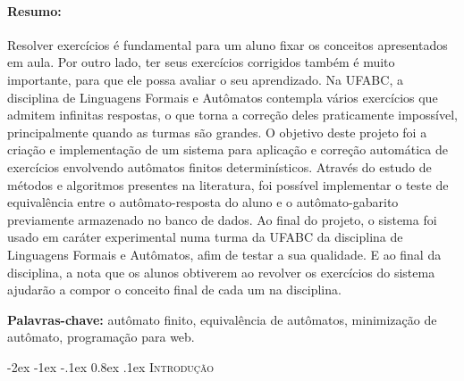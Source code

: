 \documentclass[plainsections, a0,  25pt]{sciposter} %
\makeatletter
\newcommand{\largo}{\fontsize{36}{40}\selectfont } %
\renewcommand\section{\@startsection {section}{1}{\z@}%
                                   {-2ex \@plus -1ex \@minus -.1ex}%
                                   {0.8ex \@plus.1ex}%
                                   {\normalfont\largo\bfseries}}
\makeatother
\begin{document}
\vspace{1.2cm}
\begin{multicols}{3}
  
\paragraph{Resumo:}
Resolver exercícios é fundamental para um aluno fixar os conceitos apresentados em aula. Por outro lado, ter seus exercícios corrigidos também é muito importante, para que ele possa avaliar o seu aprendizado. Na UFABC, a disciplina de Linguagens Formais e Autômatos contempla vários exercícios que admitem infinitas respostas, o que torna a correção deles praticamente impossível, principalmente quando as turmas são grandes. O objetivo deste projeto foi a criação e implementação de um sistema para aplicação e correção automática de exercícios envolvendo autômatos finitos determinísticos. Através do estudo de métodos e algoritmos presentes na literatura, foi possível implementar o teste de equivalência entre o autômato-resposta do aluno e o autômato-gabarito previamente armazenado no banco de dados. Ao final do projeto, o sistema foi usado em caráter experimental numa turma da UFABC da disciplina de Linguagens Formais e Autômatos, afim de testar a sua qualidade. E ao final da disciplina, a nota que os alunos obtiverem ao revolver os exercícios do sistema ajudarão a compor o conceito final de cada um na disciplina.

\noindent \textbf{Palavras-chave:} autômato finito, equivalência de autômatos, minimização de autômato, programação para web.


\section{\textsc{Introdução}}

%


\end{multicols}
\end{document}
